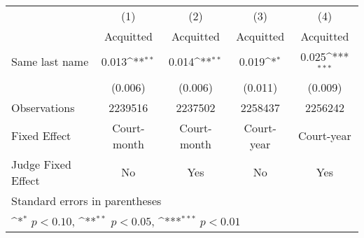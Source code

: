 {
\def\sym#1{\ifmmode^{#1}\else\(^{#1}\)\fi}
\begin{tabular}{l*{4}{c}}
\hline\hline
                    &\multicolumn{1}{c}{(1)}&\multicolumn{1}{c}{(2)}&\multicolumn{1}{c}{(3)}&\multicolumn{1}{c}{(4)}\\
                    &\multicolumn{1}{c}{Acquitted}&\multicolumn{1}{c}{Acquitted}&\multicolumn{1}{c}{Acquitted}&\multicolumn{1}{c}{Acquitted}\\
\hline
Same last name      &       0.013\sym{**} &       0.014\sym{**} &       0.019\sym{*}  &       0.025\sym{***}\\
                    &     (0.006)         &     (0.006)         &     (0.011)         &     (0.009)         \\
\hline
Observations        &     2239516         &     2237502         &     2258437         &     2256242         \\
Fixed Effect        & Court-month         & Court-month         &  Court-year         &  Court-year         \\
Judge Fixed Effect  &          No         &         Yes         &          No         &         Yes         \\
\hline\hline
\multicolumn{5}{l}{\footnotesize Standard errors in parentheses}\\
\multicolumn{5}{l}{\footnotesize \sym{*} \(p<0.10\), \sym{**} \(p<0.05\), \sym{***} \(p<0.01\)}\\
\end{tabular}
}
